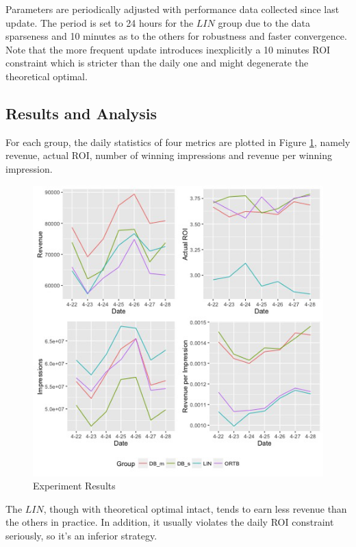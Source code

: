 \documentclass[sigconf]{acmart}
\begin{document}
Parameters are periodically adjusted with performance data collected since last update.
The period is set to 24 hours for the $LIN$ group due to the data sparseness
    and 10 minutes as to the others for robustness and faster convergence.
Note that the more frequent update introduces inexplicitly a 10 minutes ROI constraint
    which is stricter than the daily one and might degenerate the theoretical optimal.

\subsection{Results and Analysis}

For each group, the daily statistics of four metrics are plotted in Figure \ref{Result},
    namely revenue, actual ROI, number of winning impressions and revenue per winning impression.

\begin{figure}[!h]
\centering
\includegraphics[width=1.0\linewidth]{./Result.jpg}
\caption{Experiment Results\label{Result}}
\end{figure}

The $LIN$, though with theoretical optimal intact, tends to earn less revenue than the others in practice.
In addition, it usually violates the daily ROI constraint seriously, so it's an inferior strategy.
\end{document}
